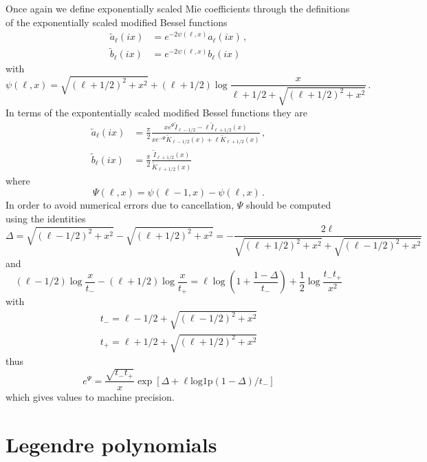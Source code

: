 \documentclass[onecolumn%
              ,superscriptaddress%
              ,aps%
              ,pra]{revtex4}
\begin{document}
Once again we define exponentially scaled Mie coefficients through the definitions of the exponentially scaled modified Bessel functions
\begin{align}
\tilde a_\ell(ix) &=  e^{-2\psi(\ell,x)} a_\ell(ix)\,,\\
\tilde b_\ell(ix) &=  e^{-2\psi(\ell,x)} b_\ell(ix)
\end{align}
with
\begin{equation}
\psi(\ell,x) = \sqrt{(\ell+1/2)^2 + x^2} + (\ell+1/2) \log\frac{x}{\ell+1/2+\sqrt{(\ell+1/2)^2+x^2}}\,.
\end{equation}
In terms of the expontentially scaled modified Bessel functions they are
\begin{align}
\tilde a_\ell(ix) &=  \frac{\pi}{2}\frac{x e^\Psi\tilde I_{\ell-1/2} - \ell \tilde I_{\ell+1/2}(x)}{x e^{-\Psi}\tilde K_{\ell-1/2}(x) + \ell \tilde K_{\ell+1/2}(x)}\,,\\
\tilde b_\ell(ix) &=  \frac{\pi}{2} \frac{\tilde I_{\ell+1/2}(x)}{\tilde K_{\ell+1/2}(x)}
\end{align}
where
\begin{equation}
\Psi(\ell, x) = \psi(\ell-1, x)- \psi(\ell, x)\,.
\end{equation}
In order to avoid numerical errors due to cancellation, $\Psi$ should be computed using the identities
\begin{equation}
\Delta = \sqrt{(\ell-1/2)^2 + x^2} - \sqrt{(\ell+1/2)^2 + x^2} = -\frac{2\ell}{\sqrt{(\ell+1/2)^2 + x^2} + \sqrt{(\ell-1/2)^2 + x^2}}
\end{equation}
and
\begin{equation}
(\ell-1/2)\log\frac{x}{t_-}-(\ell+1/2)\log\frac{x}{t_+} = 
\ell \log\left(1+\frac{1-\Delta}{t_-}\right)+\frac{1}{2}\log\frac{t_- t_+}{x^2}
\end{equation}
with
\begin{align}
t_- = \ell-1/2+\sqrt{(\ell-1/2)^2+x^2} \\
t_+ = \ell+1/2+\sqrt{(\ell+1/2)^2+x^2}
\end{align}
thus
\begin{equation}
e^\Psi = \frac{\sqrt{t_-t_+}}{x}\exp\left[\Delta + \ell \mathrm{log1p}(1-\Delta)/t_-\right]
\end{equation}
which gives values to machine precision.



\section{Legendre polynomials}
\end{document}
